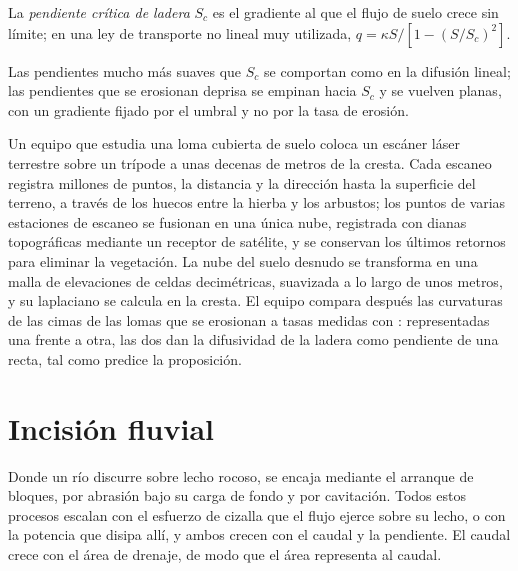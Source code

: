 \begin{definition}\label{def:b3:quantitative-geomorphology:critical}
La \emph{pendiente crítica de ladera}
$S_c$ es el gradiente al que el flujo de suelo crece sin límite; en una ley de transporte no lineal
muy utilizada, $q = \kappa S/[1 - (S/S_c)^2]$.
\end{definition}

Las pendientes mucho más suaves que $S_c$ se comportan como en la difusión lineal; las pendientes
que se erosionan deprisa se empinan hacia $S_c$ y se vuelven planas, con un gradiente fijado
por el umbral y no por la tasa de erosión.

\begin{inthefield}
Un equipo que estudia una loma cubierta de suelo coloca un escáner láser terrestre sobre un
trípode a unas decenas de metros de la cresta. Cada escaneo registra millones de
puntos, la distancia y la dirección hasta la superficie del terreno, a través de los huecos
entre la hierba y los arbustos; los puntos de varias estaciones de escaneo se fusionan
en una única nube, registrada con dianas topográficas mediante un receptor de satélite,
y se conservan los últimos retornos para eliminar la vegetación. La nube del suelo desnudo
se transforma en una malla de elevaciones de celdas decimétricas, suavizada a lo largo de unos
metros, y su laplaciano se calcula en la cresta. El equipo compara después las
curvaturas de las cimas de las lomas que se erosionan a tasas medidas con : representadas una frente a otra, las dos dan la difusividad de la
ladera como pendiente de una recta, tal como predice la proposición.
\end{inthefield}

\section{Incisión fluvial}\label{sec:b3:quantitative-geomorphology:rivers}

Donde un río discurre sobre lecho rocoso, se encaja mediante el arranque de bloques, por
abrasión bajo su carga de fondo y por cavitación. Todos estos procesos escalan con el esfuerzo
de cizalla que el flujo ejerce sobre su lecho, o con la potencia que disipa allí, y ambos crecen
con el caudal y la pendiente. El caudal crece con el área de drenaje, de modo que el área
representa al caudal.

